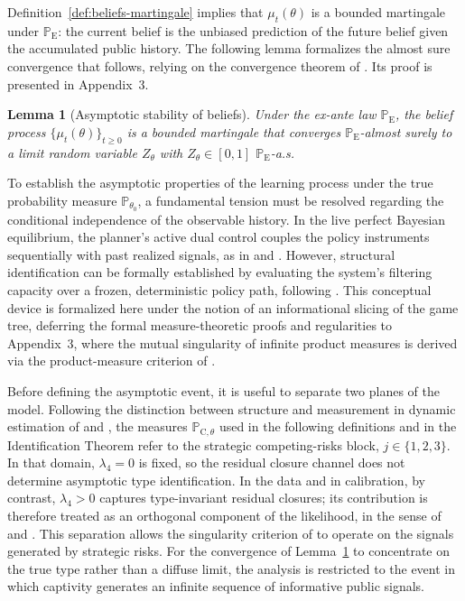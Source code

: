 \documentclass[ecta,nameyear,draft]{econsocart}
\theoremstyle{plain}
\newtheorem{lemma}[theorem]{Lemma}
\theoremstyle{definition}
\newcommand{\ProbE}{\mathbb{P}_{\mathrm{E}}}
\newcommand{\ProbC}[1]{\mathbb{P}_{\mathrm{C},#1}}
\newcommand{\1}{\mathbf{1}}
\begin{document}
Definition~\ref{def:beliefs-martingale} implies that $\mu_t(\theta)$ is a bounded martingale under $\ProbE$: the current belief is the unbiased prediction of the future belief given the accumulated public history. The following lemma formalizes the almost sure convergence that follows, relying on the convergence theorem of \citet{Doob1953Stochastic}. Its proof is presented in Appendix~3.

\begin{lemma}[Asymptotic stability of beliefs]\label{lem:asymptotic-beliefs}
Under the ex-ante law $\ProbE$, the belief process $\{\mu_t(\theta)\}_{t\ge 0}$ is a bounded martingale that converges $\ProbE$-almost surely to a limit random variable $Z_\theta$ with $Z_\theta\in[0,1]$ $\ProbE$-a.s.
\end{lemma}

\smallskip

To establish the asymptotic properties of the learning process under the true probability measure $\mathbb{P}_{\theta_0}$, a fundamental tension must be resolved regarding the conditional independence of the observable history. In the live perfect Bayesian equilibrium, the planner's active dual control couples the policy instruments sequentially with past realized signals, as in \citet{AghionBoltonHarrisJullien1991} and \citet{EasleyKiefer1988}. However, structural identification can be formally established by evaluating the system's filtering capacity over a frozen, deterministic policy path, following \citet{BlackwellDubins1962}. This conceptual device is formalized here under the notion of an informational slicing of the game tree, deferring the formal measure-theoretic proofs and regularities to Appendix~3, where the mutual singularity of infinite product measures is derived via the product-measure criterion of \citet{Kakutani1948}.

Before defining the asymptotic event, it is useful to separate two planes of the model. Following the distinction between structure and measurement in dynamic estimation of \citet{Rust1987} and \citet{MagnacThesmar2002}, the measures $\ProbC{\theta}$ used in the following definitions and in the Identification Theorem refer to the strategic competing-risks block, $j\in\{1,2,3\}$. In that domain, $\lambda_4=0$ is fixed, so the residual closure channel does not determine asymptotic type identification. In the data and in calibration, by contrast, $\lambda_4>0$ captures type-invariant residual closures; its contribution is therefore treated as an orthogonal component of the likelihood, in the sense of \citet{Lancaster1990} and \citet{AbbringVanDenBerg2003}. This separation allows the singularity criterion of \citet{Kakutani1948} to operate on the signals generated by strategic risks. For the convergence of Lemma~\ref{lem:asymptotic-beliefs} to concentrate on the true type rather than a diffuse limit, the analysis is restricted to the event in which captivity generates an infinite sequence of informative public signals.
\end{document}
